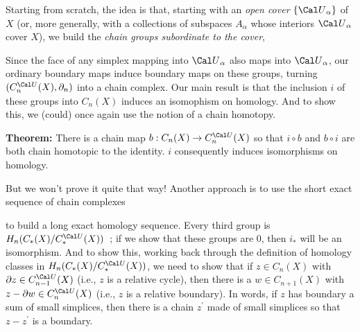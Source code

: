 \vfill
\eject

Starting from scratch, the idea is that, starting with an {\it open cover} $\{{\Cal U}_\alpha\}$
of $X$ (or, more generally, with a collections of subspaces $A_\alpha$ whose interiors 
${\Cal U}_\alpha$ cover $X$), we build the {\it chain groups subordinate to the cover},

\ssk

 
\ssk

Since the face of any simplex mapping into ${\Cal U}_\alpha$ also maps into ${\Cal U}_\alpha$,
our ordinary boundary maps induce boundary maps on these groups, turning
$(C_n^{\Cal U}(X),\partial_n)$ into a chain complex. Our main result is that the inclusion
$i$ of these groups into $C_n(X)$ induces an isomophism on homology. And to show this, we (could) once
again use the notion of a chain homotopy.

\ssk

{\bf Theorem:} There is a chain map $b:C_n(X)\ra C_n^{\Cal U}(X)$ so that $i\circ b$ and $b\circ i$ are both chain 
homotopic to the identity. $i$ consequently induces isomorphisms on homology.

\ssk

But we won't prove it quite that way! Another approach is to use the short exact sequence of chain 
complexes

\ssk


\ssk

to build a long exact homology sequence. Every third group is $H_n(C_*(X)/C_*^{\Cal U}(X))$~;
if we show that these groups are $0$, then $i_*$ will be an isomorphism. And to show \u{this},
working back through the definition of homology classes in $H_n(C_*(X)/C_*^{\Cal U}(X))$,
we need to show that if $z\in C_n(X)$ with $\del z\in C_{n-1}^{\Cal U}(X)$ (i.e., $z$ is a relative cycle), 
then there is a $w\in C_{n+1}(X)$ with $z-\del w\in C_n^{\Cal U}(X)$ (i.e., $z$ is a relative boundary).
In words, if $z$ has boundary a sum of small simplices, then there is a chain $z^\prime$
made of small simplices so that $z-z^\prime$ is a boundary.

\vfill
\eject




